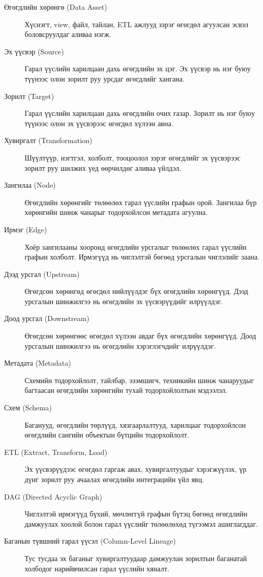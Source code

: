 \begin{description}
    \item[Өгөгдлийн хөрөнгө (Data Asset)] Хүснэгт, view, файл, тайлан, ETL ажлууд зэрэг өгөгдөл агуулсан эсвэл боловсруулдаг аливаа нэгж.
    
    \item[Эх үүсвэр (Source)] Гарал үүслийн харилцаан дахь өгөгдлийн эх цэг. Эх үүсвэр нь нэг буюу түүнээс олон зорилт руу урсдаг өгөгдлийг хангана.
    
    \item[Зорилт (Target)] Гарал үүслийн харилцаан дахь өгөгдлийн очих газар. Зорилт нь нэг буюу түүнээс олон эх үүсвэрээс өгөгдөл хүлээн авна.
    
    \item[Хувиргалт (Transformation)] Шүүлтүүр, нэгтгэл, холболт, тооцоолол зэрэг өгөгдлийг эх үүсвэрээс зорилт руу шилжих үед өөрчилдөг аливаа үйлдэл.
    
    \item[Зангилаа (Node)] Өгөгдлийн хөрөнгийг төлөөлөх гарал үүслийн графын орой. Зангилаа бүр хөрөнгийн шинж чанарыг тодорхойлсон метадата агуулна.
    
    \item[Ирмэг (Edge)] Хоёр зангилааны хооронд өгөгдлийн урсгалыг төлөөлөх гарал үүслийн графын холболт. Ирмэгүүд нь чиглэлтэй бөгөөд урсгалын чиглэлийг заана.
    
    \item[Дээд урсгал (Upstream)] Өгөгдсөн хөрөнгөд өгөгдөл нийлүүлдэг бүх өгөгдлийн хөрөнгүүд. Дээд урсгалын шинжилгээ нь өгөгдлийн эх үүсвэрүүдийг илрүүлдэг.
    
    \item[Доод урсгал (Downstream)] Өгөгдсөн хөрөнгөөс өгөгдөл хүлээн авдаг бүх өгөгдлийн хөрөнгүүд. Доод урсгалын шинжилгээ нь өгөгдлийн хэрэглэгчдийг илрүүлдэг.
    
    \item[Метадата (Metadata)] Схемийн тодорхойлолт, тайлбар, эзэмшигч, техникийн шинж чанаруудыг багтаасан өгөгдлийн хөрөнгийн тухай тодорхойлолтын мэдээлэл.
    
    \item[Схем (Schema)] Баганууд, өгөгдлийн төрлүүд, хязгаарлалтууд, харилцааг тодорхойлсон өгөгдлийн сангийн объектын бүтцийн тодорхойлолт.
    
    \item[ETL (Extract, Transform, Load)] Эх үүсвэрүүдээс өгөгдөл гаргаж авах, хувиргалтуудыг хэрэгжүүлэх, үр дүнг зорилт руу ачаалах өгөгдлийн интеграцийн үйл явц.
    
    \item[DAG (Directed Acyclic Graph)] Чиглэлтэй ирмэгүүд бүхий, мөчлөггүй графын бүтэц бөгөөд өгөгдлийн дамжуулах хоолой болон гарал үүслийг төлөөлөхөд түгээмэл ашиглагддаг.
    
    \item[Баганын түвшний гарал үүсэл (Column-Level Lineage)] Тус тусдаа эх баганыг хувиргалтуудаар дамжуулан зорилтын баганатай холбодог нарийвчилсан гарал үүслийн хяналт.
\end{description}

